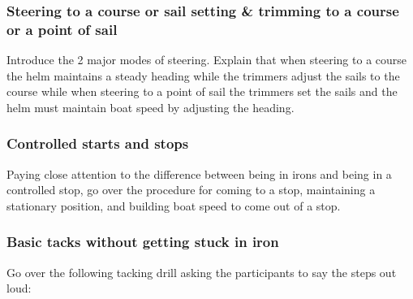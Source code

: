 \documentclass[12pt]{scrartcl}
\begin{document}
\subsubsection{Steering to a course or sail setting \& trimming to a course or a point of sail} \label{subsubsec:steering and trimming}

Introduce the 2 major modes of steering. Explain that when steering to a course the helm maintains a steady heading while the trimmers adjust the sails to the course while when steering to a point of sail the trimmers set the sails and the helm must maintain boat speed by adjusting the heading.

\subsubsection{Controlled starts and stops} \label{subsubsec:controlled starts and stops}

Paying close attention to the difference between being in irons and being in a controlled stop, go over the procedure for coming to a stop, maintaining a stationary position, and building boat speed to come out of a stop.

\subsubsection{Basic tacks without getting stuck in iron} \label{subsubsec:basic tacks}

Go over the following tacking drill asking the participants to say the steps out loud:
\end{document}
